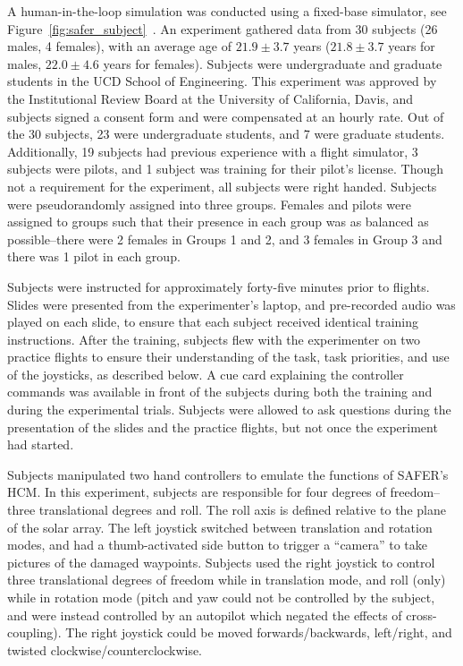 \documentclass[]{aiaa-tc}%
\begin{document}
A human-in-the-loop simulation was conducted using a fixed-base simulator, see Figure~\ref{fig:safer_subject}~\cite{duda2015development}. An experiment gathered data from 30 subjects (26 males, 4 females), with an average age of $21.9\pm3.7$ years ($21.8\pm3.7$ years for males, $22.0\pm4.6$ years for females). Subjects were undergraduate and graduate students in the UCD School of Engineering. This experiment was approved by the Institutional Review Board at the University of California, Davis, and subjects signed a consent form and were compensated at an hourly rate. Out of the 30 subjects, 23 were undergraduate students, and 7 were graduate students. Additionally, 19 subjects had previous experience with a flight simulator, 3 subjects were pilots, and 1 subject was training for their pilot's license. Though not a requirement for the experiment, all subjects were right handed. Subjects were pseudorandomly assigned into three groups. Females and pilots were assigned to groups such that their presence in each group was as balanced as possible--there were 2 females in Groups 1 and 2, and 3 females in Group 3 and there was 1 pilot in each group.

Subjects were instructed for approximately forty-five minutes prior to flights. Slides were presented from the experimenter's laptop, and pre-recorded audio was played on each slide, to ensure that each subject received identical training instructions. After the training, subjects flew with the experimenter on two practice flights to ensure their understanding of the task, task priorities, and use of the joysticks, as described below. A cue card explaining the controller commands was available in front of the subjects during both the training and during the experimental trials. Subjects were allowed to ask questions during the presentation of the slides and the practice flights, but not once the experiment had started.

Subjects manipulated two hand controllers to emulate the functions of SAFER's HCM. In this experiment, subjects are responsible for four degrees of freedom--three translational degrees and roll. The roll axis is defined relative to the plane of the solar array. The left joystick switched between translation and rotation modes, and had a thumb-activated side button to trigger a ``camera'' to take pictures of the damaged waypoints. Subjects used the right joystick to control three translational degrees of freedom while in translation mode, and roll (only) while in rotation mode (pitch and yaw could not be controlled by the subject, and were instead controlled by an autopilot which negated the effects of cross-coupling). The right joystick could be moved forwards/backwards, left/right, and twisted clockwise/counterclockwise.
\end{document}

